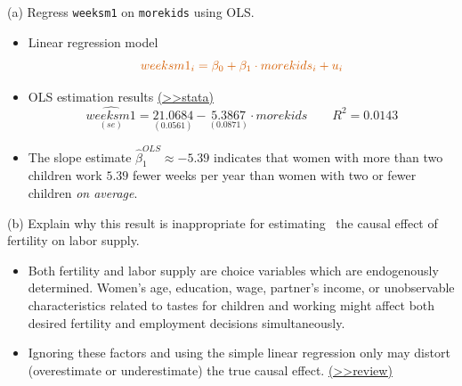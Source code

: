 \documentclass[
  10pt,
  ignorenonframetext,
]{beamer}
\providecommand{\tightlist}{%
  \setlength{\itemsep}{0pt}\setlength{\parskip}{0pt}}
\begin{document}
\begin{frame}{(a) Regress \texttt{weeksm1} on \texttt{morekids} using
OLS.}
\protect\hypertarget{q1-regOLS}{}
\begin{itemize}
\item
  Linear regression model \[
  \color{red}{weeksm1_i = \beta_0 + \beta_1 \cdot morekids_i + u_i}
  \]
\item
  OLS estimation results
  \footnotesize \protect\hyperlink{res1-regOLS}{(\textgreater\textgreater stata)}
  \normalsize \[
  \underset{(se)}{\widehat{weeksm1}} = \underset{(0.0561)}{21.0684} -  \underset{(0.0871)}{5.3867} \cdot morekids \qquad R^2=0.0143
  \]
\item
  The slope estimate \(\hat{\beta}_1^{OLS} \approx -5.39\) indicates
  that women with more than two children work \(5.39\) fewer weeks per
  year than women with two or fewer children \emph{on average}.
\end{itemize}
\end{frame}

\begin{frame}{(b) Explain why this result is inappropriate for
estimating ~the causal effect of fertility on labor supply.}
\protect\hypertarget{LRissue}{}
\begin{itemize}
\tightlist
\item
  Both fertility and labor supply are choice variables which are
  endogenously determined. Women's age, education, wage, partner's
  income, or unobservable characteristics related to tastes for children
  and working might affect both desired fertility and employment
  decisions simultaneously.
\end{itemize}

\vspace{3mm}

\begin{itemize}
\tightlist
\item
  Ignoring these factors and using the simple linear regression only may
  distort (overestimate or underestimate) the true causal effect.
  \footnotesize \protect\hyperlink{OVB}{(\textgreater\textgreater review)}
  \normalsize
\end{itemize}
\end{frame}
\end{document}

